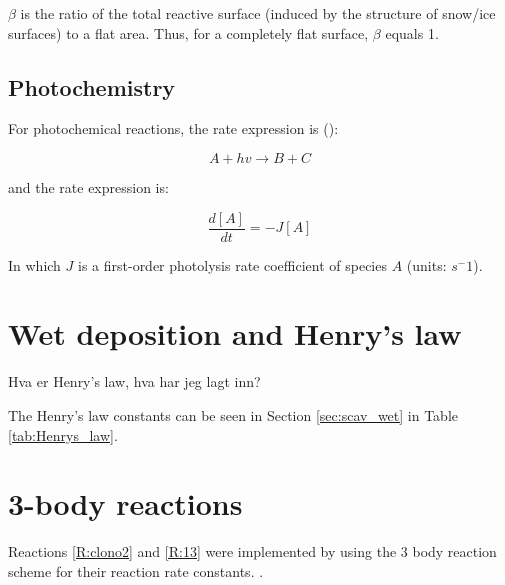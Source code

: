 \medskip

$\beta$ is the ratio of the total reactive surface (induced by the structure of snow/ice surfaces) to a flat area. Thus, for a completely flat surface, $\beta$ equals 1. 





\subsection{Photochemistry}

For photochemical reactions, the rate expression is (\cite{AtmModFund}):

\begin{equation*}
    A + hv \rightarrow B + C
\end{equation*}

and the rate expression is: 

\begin{equation*}
    \frac{d[A]}{dt} = -J[A]
\end{equation*}

In which $J$ is a first-order photolysis rate coefficient of species $A$ (units: $s^-1$). 

\section{Wet deposition and Henry's law}

Hva er Henry's law, hva har jeg lagt inn?

The Henry's law constants can be seen in Section \ref{sec:scav_wet} in Table \ref{tab:Henrys_law}. 


\section{3-body reactions}


Reactions \ref{R:clono2} and \ref{R:13} were implemented by using the 3 body reaction scheme for their reaction rate constants. \cite{SovdeManual}. 